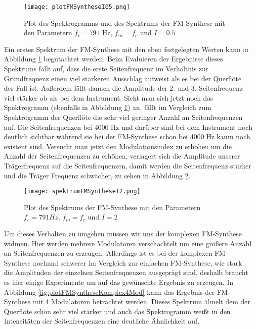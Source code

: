 \begin{figure} [ht]
\centering
  \texttt{[image: plotFMSyntheseI05.png]}
\caption{Plot des Spektrogramms und des Spektrums der FM-Synthese mit den Parametern $f_c = 791$ Hz, $f_m = f_c$ und $I = 0.5$ }
\label{fig:plotFMSyntheseI05}
\end{figure}

Ein erstes Spektrum der FM-Synthese mit den eben festgelegten Werten kann in Abbildung \ref{fig:plotFMSyntheseI05} begutachtet werden. Beim Evaluieren der Ergebnisse dieses Spektrums fällt auf, dass die erste Seitenfrequenz im Verhältnis zur Grundfrequenz einen viel stärkeren Ausschlag aufweist als es bei der Querflöte der Fall ist. Außerdem fällt danach die Amplitude der 2. und 3. Seitenfrequenz viel stärker ab als bei dem Instrument. Sieht man sich jetzt noch das Spektrogramm (ebenfalls in Abbildung \ref{fig:plotFMSyntheseI05}) an, fällt im Vergleich zum Spektrogramm der Querflöte die sehr viel geringer Anzahl an Seitenfrequenzen auf. Die Seitenfrequenzen bei 4000 Hz und darüber sind bei dem Instrument noch deutlich sichtbar während sie bei der FM-Synthese schon bei 4000 Hz kaum noch existent sind. Versucht man jetzt den Modulationsindex zu erhöhen um die Anzahl der Seitenfrequenzen zu erhöhen, verlagert sich die Amplitude unserer Trägerfrequenz auf die Seitenfrequenzen, damit werden die Seitenfrequenz stärker und die Träger Frequenz schwächer, zu sehen in Abbildung \ref{fig:spektrumFMSyntheseI2}. 

\begin{figure} [ht]
\centering
  \texttt{[image: spektrumFMSyntheseI2.png]}
\caption{Plot des Spektrums der FM-Synthese mit den Parametern $f_c = 791 Hz$, $f_m = f_c$ und $I = 2$}
\label{fig:spektrumFMSyntheseI2}
\end{figure}

Um dieses Verhalten zu umgehen müssen wir uns der komplexen FM-Synthese widmen. Hier werden mehrere Modulatoren verschachtelt um eine größere Anzahl an Seitenfrequenzen zu erzeugen. Allerdings ist es bei der komplexen FM-Synthese nochmal schwerer im Vergleich zur einfachen FM-Synthese, wie stark die Amplituden der einzelnen Seitenfrequenzen ausgeprägt sind, deshalb braucht es hier einige Experimente um auf das gewünschte Ergebnis zu erzeugen. In Abbildung \ref{fig:plotFMSyntheseKomplex4Mod} kann das Ergebnis der FM-Synthese mit 4 Modulatoren betrachtet werden. Dieses Spektrum ähnelt dem der Querflöte schon sehr viel stärker und auch das Spektrogramm weißt in den Intensitäten der Seitenfrequenzen eine deutliche Ähnlichkeit auf.

